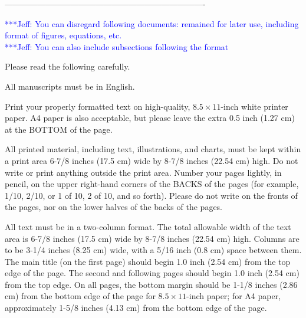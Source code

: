 \documentclass[times, 10pt,twocolumn]{article}
\newcommand{\skonote}[1]{ {\textcolor{blue} { ***Jeff: #1 }}}
\newcommand{\skonote}[1]{}
\begin{document}
------------------------------------------------------------------------- 


\skonote{You can disregard following documents: remained for later use, including format of figures, equations, etc.}\\
\skonote{You can also include subsections following the format}





Please read the following carefully.


All manuscripts must be in English.


Print your properly formatted text on high-quality, $8.5 \times 11$-inch 
white printer paper. A4 paper is also acceptable, but please leave the 
extra 0.5 inch (1.27 cm) at the BOTTOM of the page.


All printed material, including text, illustrations, and charts, must be 
kept within a print area 6-7/8 inches (17.5 cm) wide by 8-7/8 inches 
(22.54 cm) high. Do not write or print anything outside the print area. 
Number your pages lightly, in pencil, on the upper right-hand corners of 
the BACKS of the pages (for example, 1/10, 2/10, or 1 of 10, 2 of 10, and 
so forth). Please do not write on the fronts of the pages, nor on the 
lower halves of the backs of the pages.



All text must be in a two-column format. The total allowable width of 
the text area is 6-7/8 inches (17.5 cm) wide by 8-7/8 inches (22.54 cm) 
high. Columns are to be 3-1/4 inches (8.25 cm) wide, with a 5/16 inch 
(0.8 cm) space between them. The main title (on the first page) should 
begin 1.0 inch (2.54 cm) from the top edge of the page. The second and 
following pages should begin 1.0 inch (2.54 cm) from the top edge. On 
all pages, the bottom margin should be 1-1/8 inches (2.86 cm) from the 
bottom edge of the page for $8.5 \times 11$-inch paper; for A4 paper, 
approximately 1-5/8 inches (4.13 cm) from the bottom edge of the page.
\end{document}
